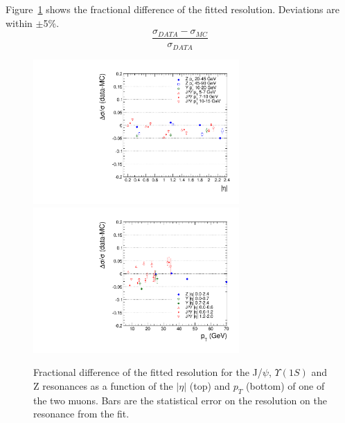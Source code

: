 Figure~\ref{fig:ResolDATAMC_8TeV} shows the fractional difference of the fitted resolution.
Deviations are within $\pm$5\%.
\[
\frac{\sigma_{DATA}-\sigma_{MC}}{\sigma_{DATA}}
\]
\begin{figure}[hbtp]  
\begin{center}
\includegraphics[width=0.7\textwidth]{figures/H4l_Style/2012_22Jan2013ReReco/ResolEta_afterCorrection}
\includegraphics[width=0.7\textwidth]{figures/H4l_Style/2012_22Jan2013ReReco/ResolPt_afterCorrection} 
 \hspace{1cm} 
   \caption{Fractional difference of the fitted resolution for the J/$\psi$,
     $\Upsilon(1S)$ and Z resonances as a function of the $|\eta|$ (top)
     and $p_T$ (bottom) of one of the two muons. Bars are the
     statistical error on the resolution on the resonance from the fit.
   \label{fig:ResolDATAMC_8TeV}}
 \end{center}
\end{figure} 



